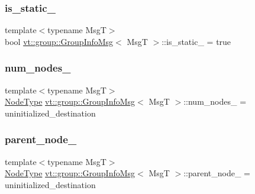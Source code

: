 \subsubsection{\texorpdfstring{is\+\_\+static\+\_\+}{is\_static\_}}
{\footnotesize\ttfamily template$<$typename MsgT$>$ \\
bool \hyperlink{structvt_1_1group_1_1_group_info_msg}{vt\+::group\+::\+Group\+Info\+Msg}$<$ MsgT $>$\+::is\+\_\+static\+\_\+ = true\hspace{0.3cm}{\ttfamily [private]}}

\mbox{\label{structvt_1_1group_1_1_group_info_msg_a85b2c79bd1f446a956265df16e8d9a83}} 
\subsubsection{\texorpdfstring{num\+\_\+nodes\+\_\+}{num\_nodes\_}}
{\footnotesize\ttfamily template$<$typename MsgT$>$ \\
\hyperlink{namespacevt_a866da9d0efc19c0a1ce79e9e492f47e2}{Node\+Type} \hyperlink{structvt_1_1group_1_1_group_info_msg}{vt\+::group\+::\+Group\+Info\+Msg}$<$ MsgT $>$\+::num\+\_\+nodes\+\_\+ = uninitialized\+\_\+destination\hspace{0.3cm}{\ttfamily [private]}}

\mbox{\label{structvt_1_1group_1_1_group_info_msg_a8893d97bde0f4d59a883b33d86ae5bf1}} 
\subsubsection{\texorpdfstring{parent\+\_\+node\+\_\+}{parent\_node\_}}
{\footnotesize\ttfamily template$<$typename MsgT$>$ \\
\hyperlink{namespacevt_a866da9d0efc19c0a1ce79e9e492f47e2}{Node\+Type} \hyperlink{structvt_1_1group_1_1_group_info_msg}{vt\+::group\+::\+Group\+Info\+Msg}$<$ MsgT $>$\+::parent\+\_\+node\+\_\+ = uninitialized\+\_\+destination\hspace{0.3cm}{\ttfamily [private]}}

